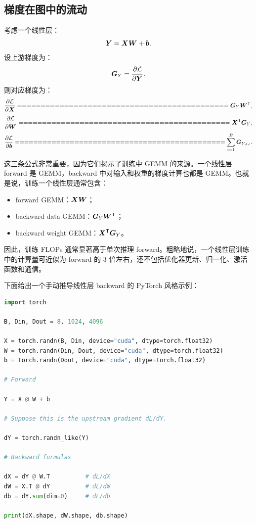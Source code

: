 \subsection{梯度在图中的流动}
\label{subsec:gradient-flow-in-graph}

考虑一个线性层：
\[
\bm{Y}=\bm{X}\bm{W}+\bm{b}.
\]
设上游梯度为：
\[
\bm{G}_Y=\frac{\partial \mathcal{L}}{\partial \bm{Y}}.
\]
则对应梯度为：
\[
\frac{\partial \mathcal{L}}{\partial \mat{X}}
=============================================

\mat{G}_Y\mat{W}^{\mathsf{T}},
\]
\[
\frac{\partial \mathcal{L}}{\partial \mat{W}}
=============================================

\mat{X}^{\mathsf{T}}\mat{G}_Y,
\]
\[
\frac{\partial \mathcal{L}}{\partial \vect{b}}
==============================================

\sum_{i=1}^{B}\mat{G}_{Y,i,:}.
\]

这三条公式非常重要，因为它们揭示了训练中 GEMM 的来源。一个线性层 forward 是 GEMM，backward 中对输入和权重的梯度计算也都是 GEMM。也就是说，训练一个线性层通常包含：

\begin{itemize}
\item forward GEMM：$\bm{X}\bm{W}$；
\item backward data GEMM：$\bm{G}_Y\bm{W}^{\mathsf{T}}$；
\item backward weight GEMM：$\bm{X}^{\mathsf{T}}\bm{G}_Y$。
\end{itemize}

因此，训练 FLOPs 通常显著高于单次推理 forward。粗略地说，一个线性层训练中的计算量可近似为 forward 的 $3$ 倍左右，还不包括优化器更新、归一化、激活函数和通信。

下面给出一个手动推导线性层 backward 的 PyTorch 风格示例：

\begin{lstlisting}[language=Python,caption={线性层 forward 与 backward 公式的张量实现},label={lst:linear-backward-manual}]
import torch

B, Din, Dout = 8, 1024, 4096

X = torch.randn(B, Din, device="cuda", dtype=torch.float32)
W = torch.randn(Din, Dout, device="cuda", dtype=torch.float32)
b = torch.randn(Dout, device="cuda", dtype=torch.float32)

# Forward

Y = X @ W + b

# Suppose this is the upstream gradient dL/dY.

dY = torch.randn_like(Y)

# Backward formulas

dX = dY @ W.T          # dL/dX
dW = X.T @ dY          # dL/dW
db = dY.sum(dim=0)     # dL/db

print(dX.shape, dW.shape, db.shape)
\end{lstlisting}

